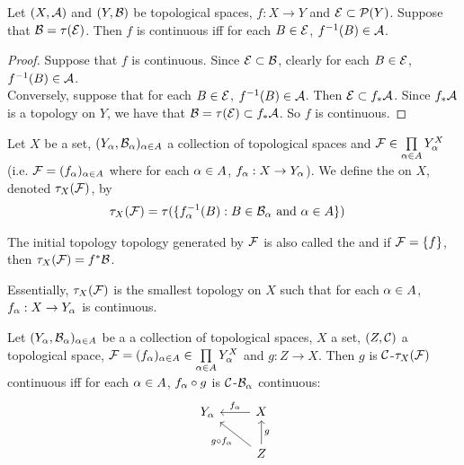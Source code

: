 \documentclass{book}
\begin{document}
	\begin{ex} \lex{}
	Let $(X,\mathcal{A})$ and $(Y,\mathcal{B})$ be topological spaces, $f:X \rightarrow Y$ and $\mathcal{E} \subset \mathcal{P}(Y)$. Suppose that $\mathcal{B} = \tau(\mathcal{E})$. Then $f$ is continuous iff for each $B \in \mathcal{E}$, $f^{-1}(B) \in \mathcal{A}$.
	\end{ex}
	
	\begin{proof}
	Suppose that $f$ is continuous. Since $\mathcal{E} \subset \mathcal{B}$, clearly for each $B \in \mathcal{E}$, $f^{-1}(B) \in \mathcal{A}$. \\
	Conversely, suppose that for each $B \in \mathcal{E}$, $f^{-1}(B) \in \mathcal{A}$. Then $\mathcal{E} \subset f_*\mathcal{A}$. Since $f_*\mathcal{A}$ is a topology on $Y$, we have that $\mathcal{B} = \tau(\mathcal{E}) \subset f_*\mathcal{A}$. So $f$ is continuous.
	\end{proof}
	
	\begin{defn} \ld{}
	Let $X$ be a set, $(Y_{\alpha}, \mathcal{B}_{\alpha})_{\alpha \in A}$ a collection of topological spaces and $\mathcal{F} \in \prod \limits_{\alpha \in A}Y_{\alpha}^X$ (i.e. $\mathcal{F} = (f_{\alpha})_{\alpha \in A}$ where for each $\alpha \in A$, $f_{\alpha}:X \rightarrow Y_{\alpha}$). We define the  on $X$, denoted $\tau_X(\mathcal{F})$, by 
	\begin{align*}
	\tau_X(\mathcal{F}) 
	&= \tau(\{f_{\alpha}^{-1}(B): B \in \mathcal{B}_{\alpha} \text{ and } \alpha \in A \})
	\end{align*}	 
	\end{defn}

	\begin{note}
	The initial topology topology generated by $\mathcal{F}$ is also called the  and if $\mathcal{F} = \{f\}$, then $\tau_X(\mathcal{F}) = f^*\mathcal{B}$.
	\end{note}
	
	\begin{note}
	Essentially, $\tau_X(\mathcal{F})$ is the smallest topology on $X$ such that for each $\alpha \in A$, $f_{\alpha}:X \rightarrow Y_{\alpha}$ is continuous. 
	\end{note}

	\begin{ex}
		Let $(Y_{\alpha}, \mathcal{B}_{\alpha})_{\alpha \in A}$ be a a collection of topological spaces, $X$ a set, $(Z, \mathcal{C})$ a topological space, $\mathcal{F} = (f_{\alpha})_{\alpha \in A} \in \prod \limits_{\alpha \in A}Y_{\alpha}^X$ and $g: Z \rightarrow X$. Then $g$ is $\mathcal{C}$-$\tau_X(\mathcal{F})$ continuous iff for each $\alpha \in A$, $f_{\alpha} \circ g$ is $\mathcal{C}$-$\mathcal{B}_{\alpha}$ continuous:
		\[ \begin{tikzcd}
			Y_{\al}	
			& X  \arrow[l, "f_{\al}"'] \\
			& Z \arrow[ul, "g \circ f_{\al}"]  \arrow[u, "g"']
		\end{tikzcd}
		\]
	\end{ex}
	
\end{document}
